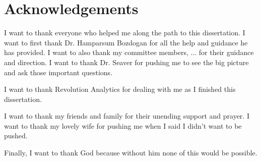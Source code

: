 \chapter*{Acknowledgements}

I want to thank everyone who helped me along the path to this dissertation.
I want to first thank Dr. Hamparsum Bozdogan for all the help and guidance he has
provided. I want to also thank my committee members, ... for their guidance and direction. I want to
thank Dr. Seaver for pushing me to see the big picture and ask those
important questions.

I want to thank Revolution Analytics for dealing with me as I finished this dissertation.

I want to thank my friends and family for their unending support and prayer. I want to
thank my lovely wife for pushing me when I said I didn't want to be pushed.

Finally, I want to thank God because without him none of this would be
possible.